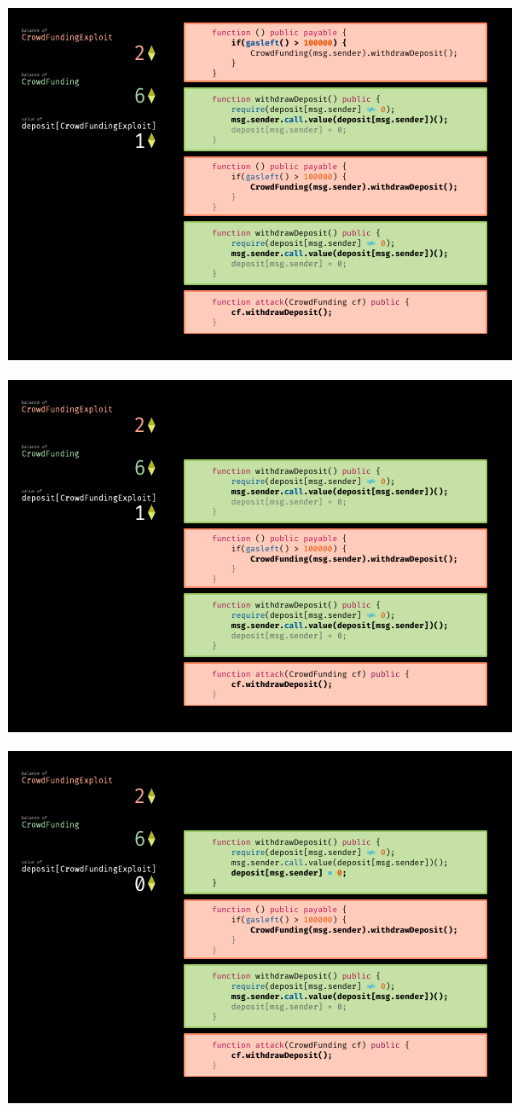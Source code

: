 \documentclass[xcolor=x11names,compress]{beamer}
\begin{document}
\begin{frame}[fragile]
\begin{overprint}
\begin{center}
		\end{center}
		\begin{center}
			\includegraphics[width=\textwidth,height=0.8\textheight,keepaspectratio]{img/reentrancy/09.pdf}
		\end{center}
		\begin{center}
			\includegraphics[width=\textwidth,height=0.8\textheight,keepaspectratio]{img/reentrancy/10.pdf}
		\end{center}
		\begin{center}
			\includegraphics[width=\textwidth,height=0.8\textheight,keepaspectratio]{img/reentrancy/11.pdf}

\end{center}
\end{overprint}
\end{frame}
\end{document}

